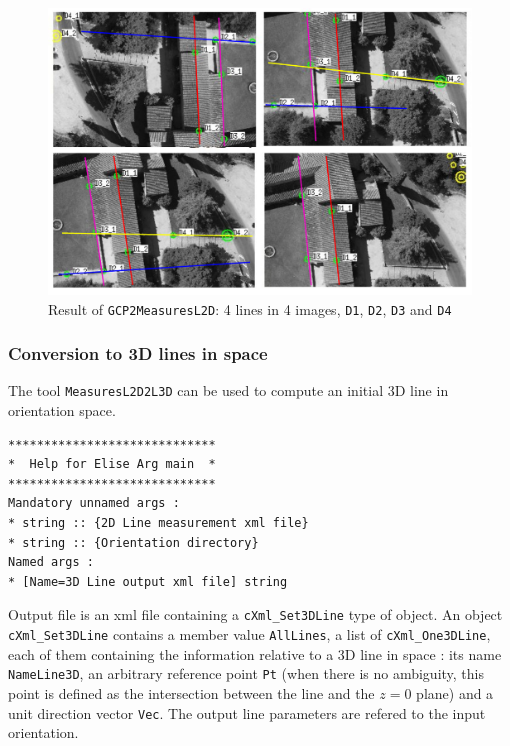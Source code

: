 \begin{figure}
	\begin{center}
		\includegraphics[width=120mm]{FIGS/Cuxa/linesSaisieAppuisInit2.pdf}
	\end{center}
	\caption{Result of \texttt{GCP2MeasuresL2D}: 4 lines in 4 images, \texttt{D1}, \texttt{D2}, \texttt{D3} and \texttt{D4} }
\end{figure}

\vspace{1cm}


\subsubsection{Conversion to 3D lines in space}

\noindent The tool \texttt{MeasuresL2D2L3D} can be used to compute an initial 3D line in orientation space. \newline

\begin{verbatim}
*****************************
*  Help for Elise Arg main  *
*****************************
Mandatory unnamed args : 
* string :: {2D Line measurement xml file}
* string :: {Orientation directory}
Named args : 
* [Name=3D Line output xml file] string
\end{verbatim}
\vspace{0.3cm}

\noindent Output file is an xml file containing a \texttt{cXml\_Set3DLine} type of object. An object \texttt{cXml\_Set3DLine} contains a member value \texttt{AllLines}, a list of \texttt{cXml\_One3DLine}, each of them containing the information relative to a 3D line in space : its name \texttt{NameLine3D}, an arbitrary reference point \texttt{Pt} (when there is no ambiguity, this point is defined as the intersection between the line and the $z=0$ plane) and a unit direction vector \texttt{Vec}. The output line parameters are refered to the input orientation. \newline

